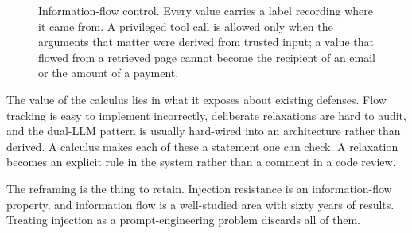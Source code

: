 \documentclass[11pt]{book}
\begin{document}
\begin{figure}[htbp]
\centering
{}
\caption{Information-flow control. Every value carries a label recording where it came from. A privileged tool call is allowed only when the arguments that matter were derived from trusted input; a value that flowed from a retrieved page cannot become the recipient of an email or the amount of a payment.}
\label{fig:ifc}
\end{figure}

The value of the calculus lies in what it exposes about existing defenses. Flow tracking is easy to implement incorrectly, deliberate relaxations are hard to audit, and the dual-LLM pattern is usually hard-wired into an architecture rather than derived. A calculus makes each of these a statement one can check. A relaxation becomes an explicit rule in the system rather than a comment in a code review.

The reframing is the thing to retain. Injection resistance is an information-flow property, and information flow is a well-studied area with sixty years of results. Treating injection as a prompt-engineering problem discards all of them.
\end{document}
